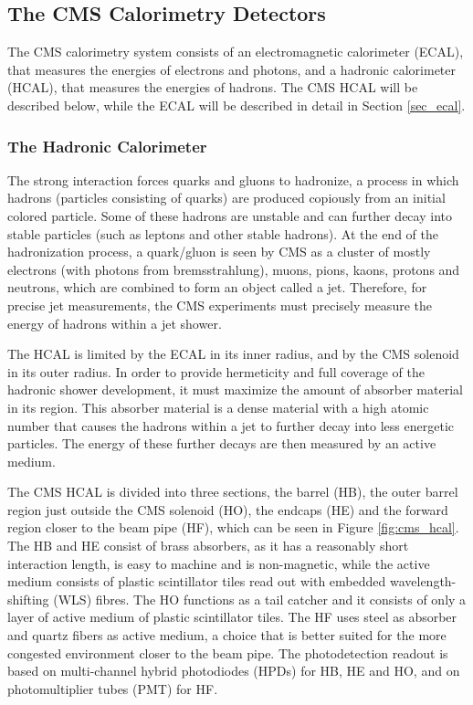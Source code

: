 \subsection{The CMS Calorimetry Detectors}

The CMS calorimetry system consists of an electromagnetic calorimeter (ECAL), that measures the energies of electrons and photons, and a hadronic calorimeter (HCAL), that measures the energies of hadrons. 
The CMS HCAL will be described below, while the ECAL will be described in detail in Section \ref{sec_ecal}.

\subsubsection{The Hadronic Calorimeter}

The strong interaction forces quarks and gluons to hadronize, a process in which hadrons (particles consisting of quarks) are produced copiously from an initial colored particle. 
Some of these hadrons are unstable and can further decay into stable particles (such as leptons and other stable hadrons). 
At the end of the hadronization process, a quark/gluon is seen by CMS as a cluster of mostly electrons (with photons from bremsstrahlung), muons, pions, kaons, protons and neutrons, which are combined to form an object called a jet. 
Therefore, for precise jet measurements, the CMS experiments must precisely measure the energy of hadrons within a jet shower. 

The HCAL is limited by the ECAL in its inner radius, and by the CMS solenoid in its outer radius. 
In order to provide hermeticity and full coverage of the hadronic shower development, it must maximize the amount of absorber material in its region. 
This absorber material is a dense material with a high atomic number that causes the hadrons within a jet to further decay into less energetic particles.
The energy of these further decays are then measured by an active medium. 

The CMS HCAL is divided into three sections, the barrel (HB), the outer barrel region just outside the CMS solenoid (HO), the endcaps (HE) and the forward region closer to the beam pipe (HF), which can be seen in Figure \ref{fig:cms_hcal}. 
The HB and HE consist of brass absorbers, as it has a reasonably short interaction length, is easy to machine and is non-magnetic, while the active medium consists of plastic scintillator tiles read out with embedded wavelength-shifting (WLS) fibres. 
The HO functions as a tail catcher and it consists of only a layer of active medium of plastic scintillator tiles. 
The HF uses steel as absorber  and quartz fibers as active medium, a choice that is better suited for the more congested environment closer to the beam pipe. 
The photodetection readout is based on multi-channel hybrid photodiodes (HPDs) for HB, HE and HO, and on photomultiplier tubes (PMT) for HF.

